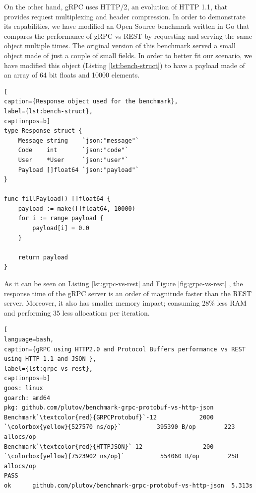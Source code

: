 On the other hand, gRPC uses HTTP/2, an evolution of HTTP 1.1, that provides request multiplexing and header compression. In order to demonstrate its capabilities, we have modified an Open Source benchmark \cite{rest-vs-grpc-bench} written in Go that compares the performance of gRPC vs REST by requesting and serving the same object multiple times. The original version of this benchmark served a small object made of just a couple of small fields. In order to better fit our scenario, we have modified this object (Listing \ref{lst:bench-struct}) to have a payload made of an array of 64 bit floats and 10000 elements.

\begin{lstlisting}[
caption={Response object used for the benchmark},
label={lst:bench-struct},
captionpos=b]
type Response struct {
	Message string    `json:"message"`
	Code    int       `json:"code"`
	User    *User     `json:"user"`
	Payload []float64 `json:"payload"`
}

func fillPayload() []float64 {
	payload := make([]float64, 10000)
	for i := range payload {
		payload[i] = 0.0
	}

	return payload
}
\end{lstlisting}

As it can be seen on Listing \ref{lst:grpc-vs-rest} and Figure \ref{fig:grpc-vs-rest} , the response time of the gRPC server is an order of magnitude faster than the REST server. Moreover, it also has smaller memory impact; consuming  28\% less RAM and performing 35 less allocations per iteration. 

\begin{lstlisting}[
language=bash,
caption={gRPC using HTTP2.0 and Protocol Buffers performance vs REST using HTTP 1.1 and JSON },
label={lst:grpc-vs-rest},
captionpos=b]
goos: linux
goarch: amd64
pkg: github.com/plutov/benchmark-grpc-protobuf-vs-http-json
Benchmark`\textcolor{red}{GRPCProtobuf}`-12            2000            `\colorbox{yellow}{527570 ns/op}`          395390 B/op        223 allocs/op
Benchmark`\textcolor{red}{HTTPJSON}`-12                 200           `\colorbox{yellow}{7523902 ns/op}`          554060 B/op        258 allocs/op
PASS
ok      github.com/plutov/benchmark-grpc-protobuf-vs-http-json  5.313s
\end{lstlisting}

